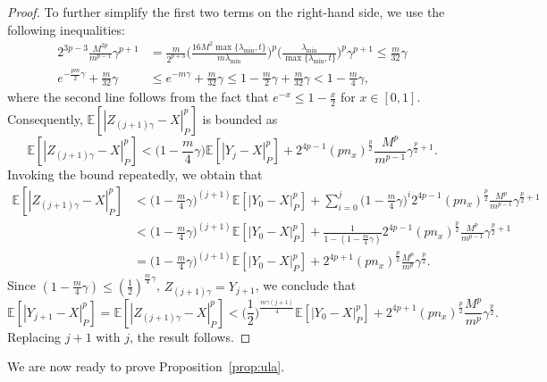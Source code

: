 \documentclass[11pt]{article}
\theoremstyle{plain}
\theoremstyle{definition}
\theoremstyle{remark}
\begin{document}
\begin{proof}
To further simplify the first two terms on the right-hand side, we use the following inequalities:
\begin{align*}
2^{3p-3}\frac{M^{2p}}{m^{p-1}} \gamma^{p+1} &= \frac{m}{2^{p+3} } \bigg (\frac{16 M ^2 \max\{\lambda_{\min},t\}}{m \lambda_{\min}}\bigg )^p\bigg(\frac{\lambda_{\min}}{\max\{\lambda_{\min},t\}} \bigg)^p \gamma^{p+1}
\leq \frac{m}{32 }  \gamma\\
e^{-\frac{pm}{2}\gamma} + \frac{m }{32}  \gamma 
&\leq
e^{-m\gamma} + \frac{m }{32}  \gamma \leq 1-\frac{m}{2}\gamma+\frac{m }{32}  \gamma < 1-\frac{m}{4}\gamma,
\end{align*}
where the second line follows from the fact that 
$e^{-x} \leq 1 - \frac{x}{2}$ for $x \in [0,1]$.
Consequently, $\mathbb{E} [| Z_{(j+1)\gamma} - X |_P^p ]$ is bounded as
\[
\mathbb{E} [| Z_{(j+1)\gamma} - X |_P^p ] < \bigg (
1 - \frac{m}{4}\gamma
\bigg )\mathbb{E} [ | Y_j - X|_P^p]  + 2^{4p-1} (pn_x)^{\frac{p}{2}} \frac{M^p}{m^{p-1} } \gamma^{\frac{p}{2}+1}.
\]
Invoking the bound repeatedly, we obtain that
\begin{equation}
\begin{split}
\mathbb{E} [| Z_{(j+1)\gamma} - X |_P^p ] &<
\bigg (
1 - \frac{m}{4}\gamma
\bigg )^{(j+1)} \mathbb{E} [ | Y_0 - X|_P^p]
+ \sum_{i=0}^j \bigg (
1 - \frac{m}{4}\gamma
\bigg )^{i} 2^{4p-1} (pn_x)^{\frac{p}{2}} \frac{M^p}{m^{p-1} } \gamma^{\frac{p}{2}+1}\\
&< \bigg (
1 - \frac{m}{4}\gamma
\bigg )^{(j+1)} \mathbb{E} [ | Y_0 - X|_P^p]
+ \frac{1}{1 - (
1 - \frac{m}{4}\gamma
)}2^{4p-1} (pn_x)^{\frac{p}{2}} \frac{M^p}{m^{p-1} } \gamma^{\frac{p}{2}+1}\\
&= \bigg (
1 - \frac{m}{4}\gamma
\bigg )^{(j+1)} \mathbb{E} [ | Y_0 - X|_P^p]
+ 2^{4p+1} (pn_x)^{\frac{p}{2}} \frac{M^p}{m^p} \gamma^{\frac{p}{2}}\nonumber.
\end{split}
\end{equation}
Since $(1 - \frac{m }{4} \gamma ) \leq (\frac{1}{2})^{\frac{m }{4} \gamma}$,  $Z_{(j+1)\gamma} = Y_{j+1}$, we conclude that
\[
\mathbb{E} [| Y_{j+1} - X |_P^p ] = \mathbb{E} [| Z_{(j+1)\gamma} - X |_P^p ] < \bigg (
\frac{1}{2}
\bigg )^{\frac{m \gamma (j+1) }{4}} \mathbb{E} [ | Y_0 - X|_P^p]
+ 2^{4p+1} (pn_x)^{\frac{p}{2}} \frac{M^p}{m^p} \gamma^{\frac{p}{2}}.
\]
Replacing $j+1$ with $j$, the result follows.
\end{proof}


We are now ready to prove Proposition~\ref{prop:ula}.
\end{document}
